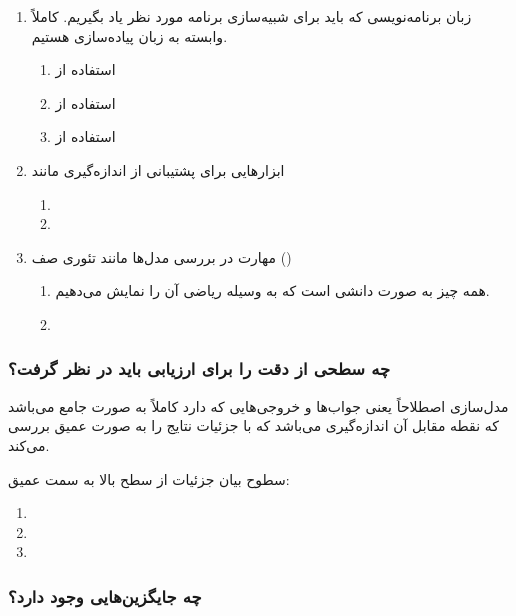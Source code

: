 \begin{enumerate}
    \item زبان برنامه‌نویسی که باید برای شبیه‌سازی برنامه مورد نظر یاد بگیریم.
    کاملاً وابسته به زبان پیاده‌سازی هستیم.
    \begin{enumerate}
        \item استفاده از 
        \item استفاده از 
        \item استفاده از 
    \end{enumerate}
    \item ابزار‌هایی برای پشتیبانی از اندازه‌گیری مانند 
    \begin{enumerate}
        \item {}
        \item {}
    \end{enumerate}
    \item مهارت در بررسی مدل‌ها مانند تئوری صف ()
    \begin{enumerate}
        \item همه چیز به صورت دانشی است که به وسیله ریاضی آن را نمایش می‌دهیم.
        \item {}
    \end{enumerate}
\end{enumerate}

\subsubsection{چه سطحی از دقت را برای ارزیابی باید در نظر گرفت؟}

مدل‌سازی اصطلاحاً  یعنی جواب‌ها و خروجی‌هایی که دارد کاملاً به
صورت جامع می‌باشد که نقطه مقابل آن اندازه‌گیری می‌باشد که با جزئیات نتایج را به
صورت عمیق بررسی می‌کند.

سطوح بیان جزئیات از سطح بالا به سمت عمیق:

\begin{enumerate}
    \item {}
    \item {}
    \item {}
\end{enumerate}

\subsubsection{چه جایگزین‌هایی وجود دارد؟}

